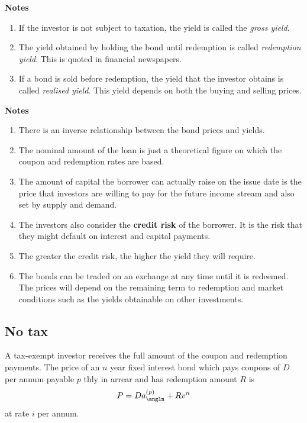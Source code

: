 \documentclass[
]{book}
\theoremstyle{definition}
\theoremstyle{definition}
\theoremstyle{definition}
\theoremstyle{definition}
\theoremstyle{remark}
\begin{document}
\textbf{Notes}

\begin{enumerate}
\def\labelenumi{\arabic{enumi}.}
\item
  If the investor is not subject to taxation, the yield is called the
  \emph{gross yield}.
\item
  The yield obtained by holding the bond until redemption is called
  \emph{redemption yield}. This is quoted in financial newspapers.
\item
  If a bond is sold before redemption, the yield that the investor
  obtains is called \emph{realised yield}. This yield depends on both the
  buying and selling prices.
\end{enumerate}

\textbf{Notes}

\begin{enumerate}
\def\labelenumi{\arabic{enumi}.}
\item
  There is an inverse relationship between the bond prices and yields.
\item
  The nominal amount of the loan is just a theoretical figure on which
  the coupon and redemption rates are based.
\item
  The amount of capital the borrower can actually raise on the issue
  date is the price that investors are willing to pay for the future
  income stream and also set by supply and demand.
\item
  The investors also consider the \textbf{credit risk} of the borrower. It
  is the risk that they might default on interest and capital
  payments.
\item
  The greater the credit risk, the higher the yield they will require.
\item
  The bonds can be traded on an exchange at any time until it is
  redeemed. The prices will depend on the remaining term to redemption
  and market conditions such as the yields obtainable on other
  investments.
\end{enumerate}

\hypertarget{no-tax}{%
\subsection{No tax}\label{no-tax}}

A tax-exempt investor receives the full amount of the coupon and
redemption payments. The price of an \(n\) year fixed interest bond which
pays coupons of \(D\) per annum payable \(p\) thly in arrear and has
redemption amount \(R\) is \[P = D a_{\angln}^{(p)} + R v^n\] at rate \(i\)
per annum.
\end{document}
